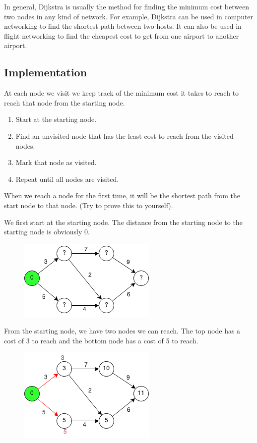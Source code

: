 \documentclass[11pt,oneside]{book}
\makeatletter
\def\maxwidth#1{\ifdim\Gin@nat@width>#1 #1\else\Gin@nat@width\fi}
\makeatother
\begin{document}
In general, Dijkstra is usually the method for finding the minimum cost between two nodes in any kind of network. For example, Dijkstra can be used in computer networking to find the shortest path between two hosts. It can also be used in flight networking to find the cheapest cost to get from one airport to another airport.

\subsection{Implementation}

At each node we visit we keep track of the minimum cost it takes to reach to reach that node from the starting node.

\begin{enumerate}
\item Start at the starting node.
\item Find an unvisited node that has the least cost to reach from the visited nodes.
\item Mark that node as visited.
\item Repeat until all nodes are visited.
\end{enumerate}

When we reach a node for the first time, it will be the shortest path from the start node to that node. (Try to prove this to yourself).

We first start at the starting node. The distance from the starting node to the starting node is obviously 0.

\vspace{5px}\begin{figure}[H]\centering
        \includegraphics[width=0.66\maxwidth{\textwidth}]{djikstra.png}
        \end{figure}

From the starting node, we have two nodes we can reach. The top node has a cost of 3 to reach and the bottom node has a cost of 5 to reach.

\vspace{5px}\begin{figure}[H]\centering
        \includegraphics[width=0.66\maxwidth{\textwidth}]{djikstra1.png}
        \end{figure}
\end{document}
